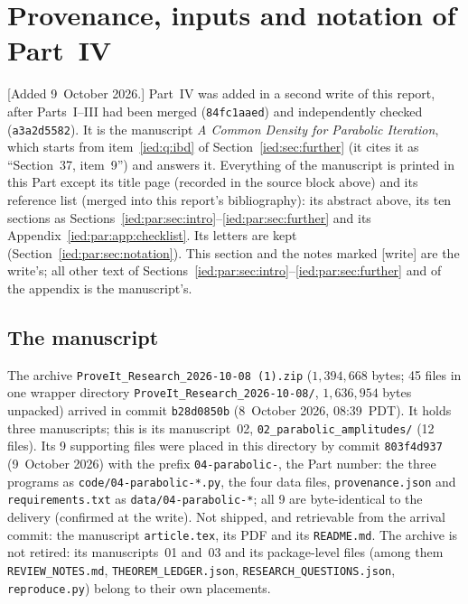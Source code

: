 \documentclass[11pt,letterpaper]{article}
\theoremstyle{remark}\newtheorem{remark}[theorem]{Remark}
\newcommand{\file}[1]{\nolinkurl{#1}}
\begin{document}
\section{Provenance, inputs and notation of Part~IV}\label{ied:par:sec:front}

[Added 9~October 2026.] Part~IV was added in a second write of this report,
after Parts~I--III had been merged (\file{84fc1aaed}) and independently
checked (\file{a3a2d5582}). It is the manuscript \emph{A Common Density for
Parabolic Iteration}, which starts from item~\ref{ied:q:ibd} of
Section~\ref{ied:sec:further} (it cites it as ``Section~37, item~9'') and answers
it. Everything of the manuscript is printed in this Part except its title page
(recorded in the source block above) and its reference list (merged into this
report's bibliography): its abstract above, its ten sections as
Sections~\ref{ied:par:sec:intro}--\ref{ied:par:sec:further} and its
Appendix~\ref{ied:par:app:checklist}. Its letters are kept
(Section~\ref{ied:par:sec:notation}). This section and the notes marked
[write] are the write's; all other text of Sections~\ref{ied:par:sec:intro}--\ref{ied:par:sec:further}
and of the appendix is the manuscript's.

\subsection{The manuscript}\label{ied:par:sec:provenance}

The archive \texttt{ProveIt\_Research\_2026-10-08\ (1).zip} ($1{,}394{,}668$ bytes;
45 files in one wrapper directory \file{ProveIt_Research_2026-10-08/},
$1{,}636{,}954$ bytes unpacked) arrived in commit \file{b28d0850b}
(8~October 2026, 08:39~PDT). It holds three manuscripts; this is its
manuscript~02, \file{02_parabolic_amplitudes/} (12 files). Its 9 supporting
files were placed in this directory by commit \file{803f4d937}
(9~October 2026) with the prefix \file{04-parabolic-}, the Part number: the
three programs as \file{code/04-parabolic-*.py}, the four data files,
\file{provenance.json} and \file{requirements.txt} as \file{data/04-parabolic-*};
all 9 are byte-identical to the delivery (confirmed at the write). Not shipped,
and retrievable from the arrival commit: the manuscript \file{article.tex}, its
PDF and its \file{README.md}. The archive is not retired: its manuscripts~01
and~03 and its package-level files (among them \file{REVIEW_NOTES.md},
\file{THEOREM_LEDGER.json}, \file{RESEARCH_QUESTIONS.json}, \file{reproduce.py})
belong to their own placements.
\end{document}
